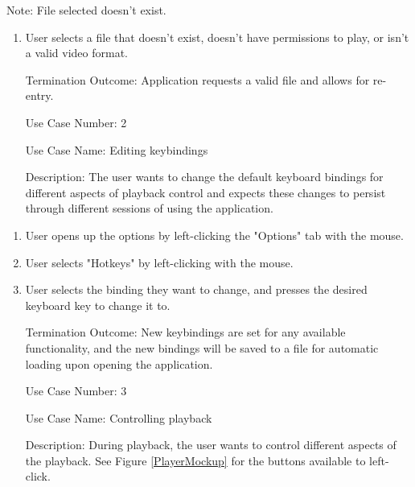 \documentclass[10pt,conference,onecolumn,compsoc]{IEEEtran}
\begin{document}

Note: File selected doesn't exist.
\begin{enumerate}
\item User selects a file that doesn't exist, doesn't have permissions to play, or isn't a valid video format.
\item[Termination Outcome:] Application requests a valid file and allows for re-entry. 

\end{enumerate}
\begin{itemize}
\item[Use Case Number:] 2
\item[Use Case Name:] Editing keybindings
\item[Description:] The user wants to change the default keyboard bindings for different aspects of playback control and expects these changes to persist through different sessions of using the application.
\end{itemize}

\begin{enumerate}
\item User opens up the options by left-clicking the "Options" tab with the mouse.
\item User selects "Hotkeys" by left-clicking with the mouse.
\item User selects the binding they want to change, and presses the desired keyboard key to change it to.
\item[Termination Outcome:] New keybindings are set for any available functionality, and the new bindings will be saved to a file for automatic loading upon opening the application. 
\end{enumerate}

\begin{itemize}
\item[Use Case Number:] 3
\item[Use Case Name:] Controlling playback
\item[Description:] During playback, the user wants to control different aspects of the playback. See Figure \ref{PlayerMockup} for the buttons available to left-click. 
\end{itemize}
\end{document}
